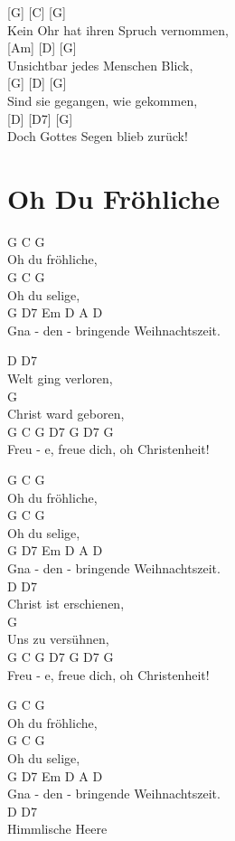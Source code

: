\documentclass[
  letterpaper,
]{scrbook}
\begin{document}
{[}G{]} {[}C{]} {[}G{]}\\
Kein Ohr hat ihren Spruch vernommen,\\
{[}Am{]} {[}D{]} {[}G{]}\\
Unsichtbar jedes Menschen Blick,\\
{[}G{]} {[}D{]} {[}G{]}\\
Sind sie gegangen, wie gekommen,\\
{[}D{]} {[}D7{]} {[}G{]}\\
Doch Gottes Segen blieb zurück!

\hypertarget{oh-du-fruxf6hliche}{%
\chapter{Oh Du Fröhliche}\label{oh-du-fruxf6hliche}}

G C G\\
Oh du fröhliche,\\
G C G\\
Oh du selige,\\
G D7 Em D A D\\
Gna - den - bringende Weihnachtszeit.

D D7\\
Welt ging verloren,\\
G\\
Christ ward geboren,\\
G C G D7 G D7 G\\
Freu - e, freue dich, oh Christenheit!

G C G\\
Oh du fröhliche,\\
G C G\\
Oh du selige,\\
G D7 Em D A D\\
Gna - den - bringende Weihnachtszeit.\\
D D7\\
Christ ist erschienen,\\
G\\
Uns zu versühnen,\\
G C G D7 G D7 G\\
Freu - e, freue dich, oh Christenheit!

G C G\\
Oh du fröhliche,\\
G C G\\
Oh du selige,\\
G D7 Em D A D\\
Gna - den - bringende Weihnachtszeit.\\
D D7\\
Himmlische Heere
\end{document}
